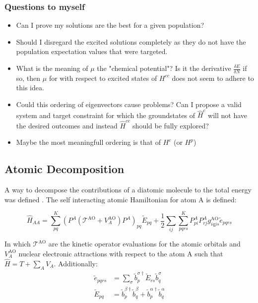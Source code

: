 \subsubsection{Questions to myself}

\begin{itemize}
  \item Can I prove my solutions are the best for a given population?
  \item Should I disregard the excited solutions completely as they do not have the population expectation values that were targeted.
  \item What is the meaning of $\mu$ the "chemical potential"? Is it the derivative $\frac{\delta E}{\delta N}$ if so, then $\mu$ for with respect to excited states of $H^{cc}$ does not seem to adhere to this idea.
  \item Could this ordering of eigenvectors cause problems? Can I propose a valid system and target constraint for which the groundstates of $\hat{H}^c$ will not have the desired outcomes and instead $\hat{H}^{cc}$ should be fully explored?
  \item Maybe the most meaningfull ordering is that of $H^c$ (or $H^p$)
 \end{itemize}


\subsection{Atomic Decomposition}

  A way to decompose the contributions of a diatomic molecule to the total energy was defined \cite{mayer2005atomic}. The self interacting atomic Hamiltonian for atom A is defined:

  \begin{equation}
    \hat{H}_{AA} = \sum_{pq}^K (P^A (\mathcal{T}^{\text{AO}} + V_{A}^{\text{AO}}) P^A)_{pq} \widetilde{E}_{pq} +  \frac{1}{2} \sum_{ij} \sum_{pqrs}^K P^{A}_{pi} P^{A}_{rj} g^{\text{AO}}_{iqjs} \widetilde{e}_{pqrs}
  \end{equation}

  In which $\mathcal{T}^{\text{AO}}$ are the kinetic operator evaluations for the atomic orbitals and $V_A^{\text{AO}}$ nuclear electronic attractions with respect to the atom A such that $\hat{H} = T + \sum_A V_A$. Additionally:
  \begin{align}
      \widetilde{e}_{pqrs} &= \sum_\sigma \widetilde{b}^{\sigma \dagger}_p  \widetilde{E}_{rs}  \widetilde{b}^{\sigma}_q \\
       \widetilde{E}_{pq} &= \widetilde{b}^{\beta \dagger}_p  \widetilde{b}^\beta_q + \widetilde{b}^{\alpha \dagger}_p  \widetilde{b}^\alpha_q
  \end{align}

